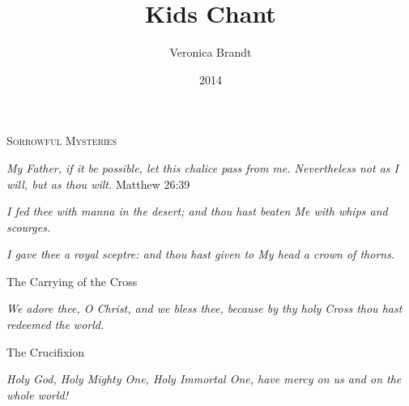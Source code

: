 \documentclass[a5paper, 12pt]{memoir}
\title{Kids Chant}
\author{Veronica Brandt}
\date{2014}
\let\oldtextbf\textbf
\begin{document}
\setlength{\parindent}{0mm}

\pagestyle{kidschant}

\setcounter{secnumdepth}{0}

\renewcommand\textbf[1]{%
    \pdfliteral direct {2 Tr 0.2 w}%
     \oldtextbf{#1}%
    \pdfliteral direct {0 Tr 0 w}%
}
\newcommand\embolden[1]{%
    \pdfliteral direct {2 Tr 0.2 w}%
     #1%
    \pdfliteral direct {0 Tr 0 w}%
}
\renewcommand\greboldfont[1]{%
    \pdfliteral direct {2 Tr 0.2 w}%
    \oldtextbf{#1}%
    \pdfliteral direct {0 Tr 0 w}%
}

\begin{center}
\textsc{Sorrowful Mysteries}
\end{center}



\bigskip

\emph{My Father, if it be possible, let this chalice pass from me. Nevertheless not as I will, but as thou wilt.} \qquad Matthew 26:39

\bigskip



\bigskip

\emph{I fed thee with manna in the desert; and thou hast beaten Me with whips and scourges.}

\bigskip



\bigskip

\emph{I gave thee a royal sceptre: and thou hast given to My head a crown of thorns.}

\bigskip

The Carrying of the Cross


\emph{We adore thee, O Christ, and we bless thee, because by thy holy Cross thou hast redeemed the world.}

\bigskip

The Crucifixion



\emph{Holy God, Holy Mighty One, Holy Immortal One, have mercy on us and on the whole world!}
\end{document}
